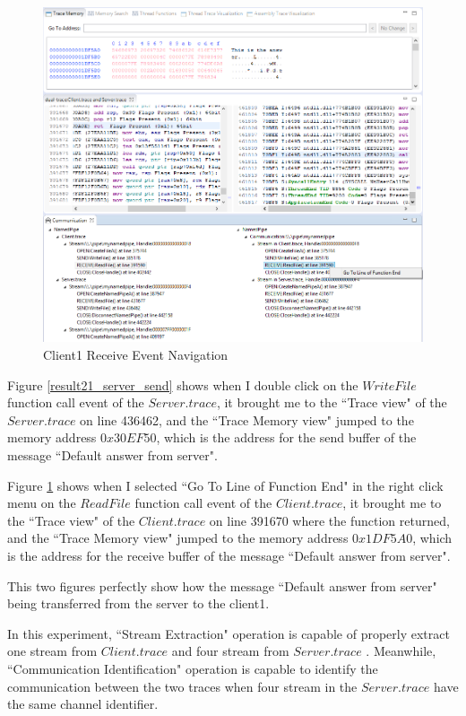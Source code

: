 \begin{figure}[H]
\centerline{\includegraphics[scale=0.4]{Figures/result21_client_read}}
 \caption{Client1 Receive Event Navigation}
\label{result21_client_read}
\end{figure}

Figure \ref{result21_server_send} shows when I double click on the $WriteFile$ function call event of the $Server.trace$, it brought me to the ``Trace view" of the $Server.trace$ on line 436462, and the ``Trace Memory view" jumped to the memory address $0x30EF50$, which is the address for the send buffer of the message ``Default answer from server".

Figure \ref{result21_client_read} shows when I selected ``Go To Line of Function End" in the right click menu on the $ReadFile$ function call event of the $Client.trace$, it brought me to the ``Trace view" of the $Client.trace$ on line 391670 where the function returned, and the ``Trace Memory view" jumped to the memory address $0x1DF5A0$, which is the address for the receive buffer of the message ``Default answer from server".

This two figures perfectly show how the message ``Default answer from server" being transferred from the server to the client1.

In this experiment, ``Stream Extraction" operation is capable of properly extract one stream from $Client.trace$ and four stream from  $Server.trace$ . Meanwhile, ``Communication Identification" operation is capable to identify the communication between the two traces when four stream in the $Server.trace$ have the same channel identifier. 

